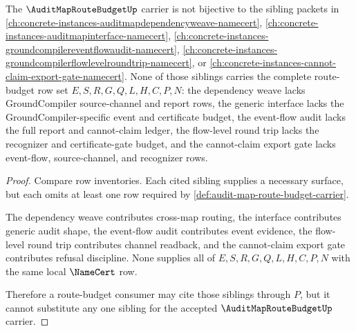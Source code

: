 \begin{theorem}
\label{thm:audit-map-route-budget-dependency-independence}
The $\AuditMapRouteBudgetUp$ carrier is not bijective to the sibling packets in \autoref{ch:concrete-instances-auditmapdependencyweave-namecert}, \autoref{ch:concrete-instances-auditmapinterface-namecert}, \autoref{ch:concrete-instances-groundcompilereventflowaudit-namecert}, \autoref{ch:concrete-instances-groundcompilerflowlevelroundtrip-namecert}, or \autoref{ch:concrete-instances-cannot-claim-export-gate-namecert}. None of those siblings carries the complete route-budget row set $E,S,R,G,Q,L,H,C,P,N$: the dependency weave lacks GroundCompiler source-channel and report rows, the generic interface lacks the GroundCompiler-specific event and certificate budget, the event-flow audit lacks the full report and cannot-claim ledger, the flow-level round trip lacks the recognizer and certificate-gate budget, and the cannot-claim export gate lacks event-flow, source-channel, and recognizer rows.
\end{theorem}
\begin{proof}
Compare row inventories. Each cited sibling supplies a necessary surface, but each omits at least one row required by \autoref{def:audit-map-route-budget-carrier}.

The dependency weave contributes cross-map routing, the interface contributes generic audit shape, the event-flow audit contributes event evidence, the flow-level round trip contributes channel readback, and the cannot-claim export gate contributes refusal discipline. None supplies all of $E,S,R,G,Q,L,H,C,P,N$ with the same local $\NameCert$ row.

Therefore a route-budget consumer may cite those siblings through $P$, but it cannot substitute any one sibling for the accepted $\AuditMapRouteBudgetUp$ carrier.
\end{proof}



